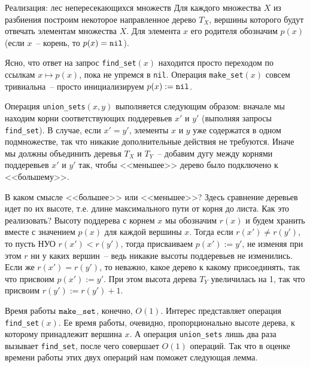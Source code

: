 \begin{algodescription}{Реализация: лес непересекающихся множеств}
    Для каждого множества $X$ из разбиения построим некоторое направленное дерево $T_X$, вершины которого будут отвечать элементам множества $X$. Для элемента $x$ его родителя обозначим $p(x)$ (если $x$~-- корень, то $p(x) = {\tt nil}$). 
    
    Ясно, что ответ на запрос {\tt find\_set}$(x)$ находится просто переходом по ссылкам $x \mapsto p(x)$, пока не упремся в {\tt nil}. Операция {\tt make\_set}$(x)$ совсем тривиальна~-- просто инициализируем $p(x) := {\tt nil}$.
    
    Операция {\tt union\_sets}$(x, y)$ выполняется следующим образом: вначале мы находим корни соответствующих поддеревьев $x'$ и $y'$ (выполняя запросы {\tt find\_set}). В случае, если $x' = y'$, элементы $x$ и $y$ уже содержатся в одном подмножестве, так что никакие дополнительные действия не требуются. Иначе мы должны объединить деревья $T_X$ и $T_Y$~-- добавим дугу между корнями поддеревьев $x'$ и $y'$ так, чтобы <<меньшее>> дерево было подключено к <<большему>>. 
    
    В каком смысле <<большее>> или <<меньшее>>? Здесь сравнение деревьев идет по их высоте, т.е. длине максимального пути от корня до листа. Как это реализовать? Высоту поддерева с корнем $x$ мы обозначим $r(x)$ и будем хранить вместе с значением $p(x)$ для каждой вершины $x$. Тогда если $r(x') \neq r(y')$, то пусть НУО $r(x') < r(y')$, тогда присваиваем $p(x') := y'$, не изменяя при этом $r$ ни у каких вершин~-- ведь никакие высоты поддеревьев не изменились. Если же $r(x') = r(y')$, то неважно, какое дерево к какому присоединять, так что присвоим $p(x') := y'$. При этом высота дерева $T_Y$ увеличилась на 1, так что присвоим $r(y') := r(y') + 1$.
\end{algodescription}

Время работы ${\tt make\_set}$, конечно, $O(1)$. Интерес представляет операция {\tt find\_set}$(x)$. Ее время работы, очевидно, пропорционально высоте дерева, к которому принадлежит вершина $x$. А операция {\tt union\_sets} лишь два раза вызывает {\tt find\_set}, после чего совершает $O(1)$ операций. Так что в оценке времени работы этих двух операций нам поможет следующая лемма.

